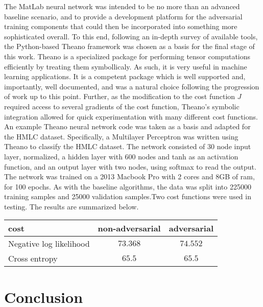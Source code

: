 \documentclass{article} %
\begin{document}
The MatLab neural network was intended to be no more than an advanced baseline scenario, and to provide a development platform for the adversarial training components that could then be incorporated into something more sophisticated overall. To this end, following an in-depth survey of available tools, the Python-based Theano framework was chosen as a basis for the final stage of this work. Theano is a specialized package for performing tensor computations efficiently by treating them symbollicaly. As such, it is very useful in machine learning applications. It is a competent package which is well supported and, importantly, well documented, and was a natural choice following the progression of work up to this point. Further, as the modification to the cost function $J$ required access to several gradients of the cost function, Theano's symbolic integration allowed for quick experimentation with many different cost functions. An example Theano neural network code was taken as a basis and adapted for the HMLC dataset. Specifically, a Multilayer Perceptron was written using Theano to classify the HMLC dataset. The network consisted of 30 node input layer, normalized, a hidden layer with 600 nodes and tanh as an activation function, and an output layer with two nodes, using softmax to read the output. The network was trained on a 2013 Macbook Pro 
	with 2 cores and 8GB of ram, for 100 epochs. As with the baseline algorithms, the data was split into 225000 training samples and 25000 validation samples.Two cost functions were used in testing. The results are summarized below.
\begin{center}
	\begin{tabular}{|l|c|c|}
	  \hline
	  cost&non-adversarial&adversarial \\
	  \hline
	  Negative log likelihood&$73.368$&$74.552$\\
	  \hline
	  Cross entropy&$65.5$&$65.5$ \\
	  \hline
	\end{tabular}
\end{center}
	



\section{Conclusion}
\label{sec:conclusion}
\end{document}
